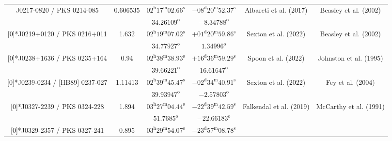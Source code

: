 \begin{landscape}
\begin{longtable}{cccccc}
  \multirow{2}[0]{*}{J0217-0820 / PKS 0214-085} & \multirow{2}[0]{*}{ 0.606535 } &  
    $ 02^\text{h}17^\text{m}02.66^\text{s}$  & $ -08^\text{d} 20^\text{m}52.37^\text{s}$  & 
    \multirow{2}[0]{*}{Albareti et al. (2017) \cite{RedRef9_2017}} & \multirow{2}[0]{*}{Beasley et al. (2002) \cite{CoordRef4_2002}} \\*
        & & $ 34.26109 ^\text{o}$ & $ -8.34788 ^\text{o}$ & & \\ \addlinespace 
  \multirow{2}[0]{*}{J0219+0120 / PKS 0216+011} & \multirow{2}[0]{*}{ 1.632 } &  
    $02^\text{h}19^\text{m}07.02^\text{s}$  & $+01^\text{d}20^\text{m}59.86^\text{s}$  & 
    \multirow{2}[0]{*}{Sexton et al. (2022) \cite{RedRef13_2022}} & \multirow{2}[0]{*}{Beasley et al. (2002) \cite{CoordRef4_2002}} \\*
    & & $ 34.77927 ^\text{o}$ & $ 1.34996 ^\text{o}$ & & \\ \addlinespace 
  \multirow{2}[0]{*}{J0238+1636 / PKS 0235+164} & \multirow{2}[0]{*}{0.94} &  
    $02^\text{h}38^\text{m}38.93^\text{s} $  & $+16^\text{d}36^\text{m}59.29^\text{s}$  & 
    \multirow{2}[0]{*}{Spoon et al. (2022) \cite{RedRef14_2022}} & \multirow{2}[0]{*}{Johnston et al. (1995) \cite{CoordRef0_1995}} \\*
    & & $ 39.66221 ^\text{o}$ & $ 16.61647 ^\text{o}$ & & \\ \addlinespace 
  \multirow{2}[0]{*}{J0239-0234 / [HB89] 0237-027} & \multirow{2}[0]{*}{1.11413} &  
    $02^\text{h}39^\text{m}45.47^\text{s}$  & $-02^\text{d}34^\text{m}40.91^\text{s}$  & 
    \multirow{2}[0]{*}{Sexton et al. (2022) \cite{RedRef13_2022}} & \multirow{2}[0]{*}{Fey et al. (2004) \cite{CoordRef2_2004}} \\*
    & & $ 39.93947 ^\text{o}$ & $ -2.57803 ^\text{o}$ & & \\ \addlinespace 
  \multirow{2}[0]{*}{J0327-2239 / PKS 0324-228} & \multirow{2}[0]{*}{ 1.894 } &  
    $03^\text{h}27^\text{m}04.44^\text{s}$  & $ -22^\text{d}39^\text{m}42.59^\text{s} $  & 
    \multirow{2}[0]{*}{Falkendal et al. (2019) \cite{RedRef16_2019}} & \multirow{2}[0]{*}{McCarthy et al. (1991) \cite{CoordRef16_1991}} \\*
  & & $ 51.7685 ^\text{o}$ & $ -22.66183 ^\text{o}$ & & \\ \addlinespace 
  \multirow{2}[0]{*}{J0329-2357 / PKS 0327-241} & \multirow{2}[0]{*}{ 0.895 } &  
    $ 03^\text{h}29^\text{m}54.07^\text{s} $  & $ -23^\text{d}57^\text{m}08.78^\text{s} $  & 

\end{longtable}
\end{landscape}

